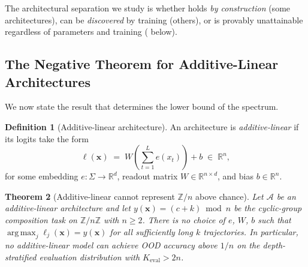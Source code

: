 \documentclass[11pt]{article}
\newtheorem{theorem}{Theorem}
\theoremstyle{definition}
\newtheorem{definition}[theorem]{Definition}
\newcommand{\R}{\mathbb{R}}
\newcommand{\Z}{\mathbb{Z}}
\DeclareMathOperator*{\argmax}{arg\,max}
\begin{document}
The architectural separation we study is whether
 holds \emph{by construction} (some
architectures), can be \emph{discovered} by training (others), or is
provably unattainable regardless of parameters and training
( below).

\subsection{The Negative Theorem for Additive-Linear Architectures}
\label{subsec:negative-theorem}

We now state the result that determines the lower bound of the
spectrum.

\begin{definition}[Additive-linear architecture]
An architecture is \emph{additive-linear} if its logits take the form
\[
\ell(\mathbf{x}) \;=\; W \!\left( \sum_{t=1}^{L} e(x_t) \right) + b
\;\in\; \R^n,
\]
for some embedding $e: \Sigma \to \R^d$, readout matrix
$W \in \R^{n \times d}$, and bias $b \in \R^n$.
\end{definition}

\begin{theorem}[Additive-linear cannot represent $\Z/n$ above chance]
\label{thm:additive-barred}
Let $\mathcal{A}$ be an additive-linear architecture and let
$y(\mathbf{x}) = (c + k) \bmod n$ be the cyclic-group composition
task on $\Z/n\Z$ with $n \geq 2$. There is no choice of $e$, $W$,
$b$ such that $\argmax_j \ell_j(\mathbf{x}) = y(\mathbf{x})$ for all
sufficiently long $k$ trajectories. In particular, no additive-linear
model can achieve OOD accuracy above $1/n$ on the depth-stratified
evaluation distribution with $K_\mathrm{eval} > 2n$.
\end{theorem}
\end{document}
